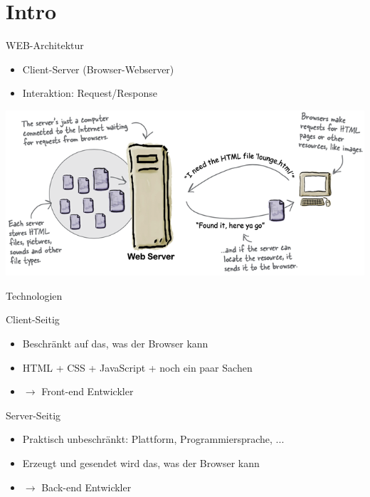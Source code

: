 \section{Intro}

\begin{definition}{WEB-Architektur}
    \begin{itemize}
        \item Client-Server (Browser-Webserver)
        \item Interaktion: Request/Response
    \end{itemize}
    \includegraphics[width=1\linewidth]{images/web_architektur.png}
\end{definition}

\begin{concept}{Technologien}
    
    Client-Seitig
    \begin{itemize}
        \item Beschränkt auf das, was der Browser kann
        \item HTML + CSS + JavaScript + noch ein paar Sachen
        \item $\rightarrow$ Front-end Entwickler
    \end{itemize}

    Server-Seitig
    \begin{itemize}
        \item Praktisch unbeschränkt: Plattform, Programmiersprache, ...
        \item Erzeugt und gesendet wird das, was der Browser kann
        \item $\rightarrow$ Back-end Entwickler
    \end{itemize}
\end{concept}